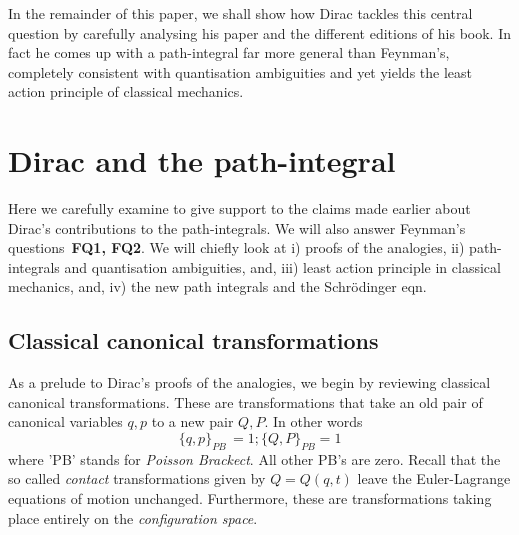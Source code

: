 \documentclass[12pt]{article}
\newcommand{\be}{\begin{equation}}
\newcommand{\ee}{\end{equation}}
\begin{document}
In the remainder of this paper, we shall show how Dirac tackles this central question by carefully analysing his paper and the different editions of his book. In fact he comes up with a path-integral far more general than Feynman's, completely consistent with quantisation ambiguities and yet
yields the least action principle of classical mechanics. 


\section{Dirac and the path-integral}
Here we carefully examine \cite{diracpaper, diracbook2, diracbook4r} to give support to the claims made earlier about Dirac's contributions
to the path-integrals. We will also answer Feynman's questions {\bf\,FQ1, FQ2}. We will chiefly look at i) proofs of the analogies, ii) 
path-integrals and quantisation ambiguities, and, iii) least action principle in classical mechanics, and, iv) the new path integrals and the
Schr\"odinger eqn. 
\subsection{Classical canonical transformations}
As a prelude to Dirac's proofs of
the analogies, we begin by reviewing classical canonical transformations.  
These are transformations that take an old pair of canonical variables $q,p$ to a new pair $Q,P$. In other words
\be
\label{eq:canonicaltr}
\{q,p\}_{PB}\,= 1; \{Q,P\}_{PB} = 1
\ee
where 'PB' stands for {\it Poisson Brackect}. All other PB's are zero. Recall that the so called {\it contact} transformations given by
$Q = Q(q,t)$ leave the Euler-Lagrange equations of motion unchanged. Furthermore, these are transformations taking place entirely on
the {\it configuration space}. 
\end{document}
